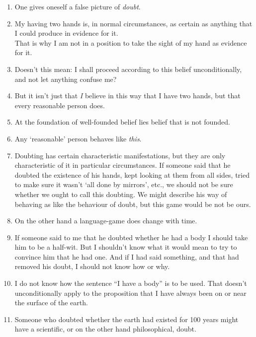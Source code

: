 \documentclass{book}
\begin{document}
\begin{enumerate}
\item
One gives oneself a false picture of \emph{doubt}.

\item
My having two hands is, in normal circumstances, as certain as anything that I
could produce in evidence for it. \\
That is why I am not in a position to take the sight of my hand as evidence for
it.

\item
Doesn't this mean: I shall proceed according to this belief unconditionally,
and not let anything confuse me?

\item
But it isn't just that \emph{I} believe in this way that I have two hands, but
that every reasonable person does.

\item
At the foundation of well-founded belief lies belief that is not founded.

\item
Any `reasonable' person behaves like \emph{this}.

\item
Doubting has certain characteristic manifestations, but they are only
characteristic of it in particular circumstances. If someone said that he
doubted the existence of his hands, kept looking at them from all sides, tried
to make sure it wasn't `all done by mirrors', etc., we should not be sure
whether we ought to call this doubting. We might describe his way of behaving
as like the behaviour of doubt, but this game would be not be ours.

\item
On the other hand a language-game does change with time.

\item
If someone said to me that he doubted whether he had a body I should take him
to be a half-wit. But I shouldn't know what it would mean to try to convince
him that he had one. And if I had said something, and that had removed his
doubt, I should not know how or why.

\item
I do not know how the sentence ``I have a body'' is to be used.  That doesn't
unconditionally apply to the proposition that I have always been on or near the
surface of the earth.

\item
Someone who doubted whether the earth had existed for 100 years might have a
scientific, or on the other hand philosophical, doubt.


\end{enumerate}
\end{document}
